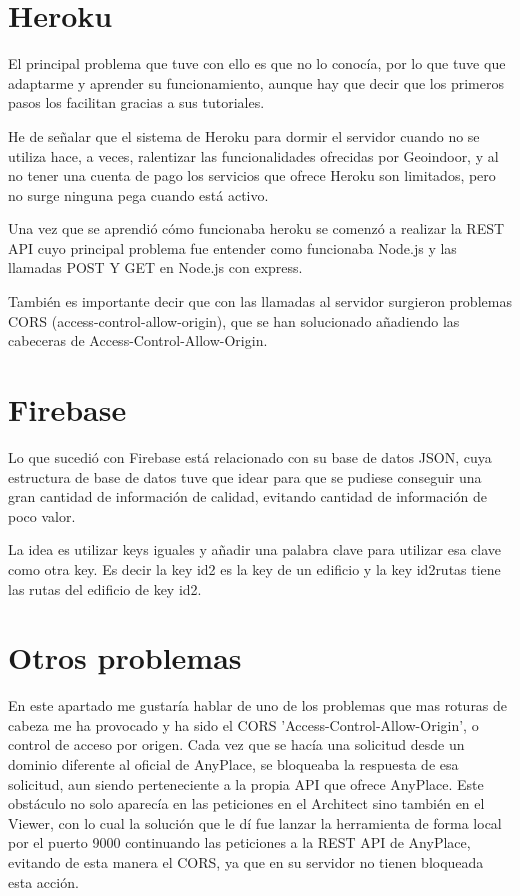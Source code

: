 \section{Heroku}\label{heroku5}

El principal problema que tuve con ello es que no lo conocía, por lo que tuve que adaptarme y aprender su funcionamiento, aunque hay que decir que los primeros pasos los facilitan gracias a sus tutoriales.

He de señalar que el sistema de Heroku para dormir el servidor cuando no se utiliza hace, a veces, ralentizar las funcionalidades ofrecidas por Geoindoor, y al no tener una cuenta de pago los servicios que ofrece Heroku son limitados, pero no surge ninguna pega cuando está activo. 

Una vez que se aprendió cómo funcionaba heroku se comenzó a realizar la REST API cuyo principal problema fue entender como funcionaba Node.js y las llamadas POST Y GET en Node.js con express.

También es importante decir que con las llamadas al servidor surgieron problemas CORS (access-control-allow-origin),
que se han solucionado añadiendo las cabeceras de Access-Control-Allow-Origin. 

\section{Firebase}\label{firebase5}

Lo que sucedió con Firebase está relacionado con su base de datos JSON, cuya estructura de base de datos tuve que idear para que se pudiese conseguir una gran cantidad de información de calidad, evitando cantidad de información de poco valor.

La idea es utilizar keys iguales y añadir una palabra clave para utilizar esa clave como otra key. Es decir la key id2 es la key de un edificio y la key id2rutas tiene las rutas del edificio de key id2.


\section{Otros problemas}\label{otros}

En este apartado me gustaría hablar de uno de los problemas que mas roturas de cabeza me ha provocado y ha sido el CORS 'Access-Control-Allow-Origin', o control de acceso por origen. Cada vez que se hacía una solicitud desde un dominio diferente al oficial de AnyPlace, se bloqueaba la respuesta de esa solicitud, aun siendo perteneciente a la propia API que ofrece AnyPlace. Este obstáculo no solo aparecía en las peticiones en el Architect sino también en el Viewer, con lo cual la solución que le dí fue lanzar la herramienta de forma local por el puerto 9000 continuando las peticiones a la REST API de AnyPlace, evitando de esta manera el CORS, ya que en su servidor no tienen bloqueada esta acción.

